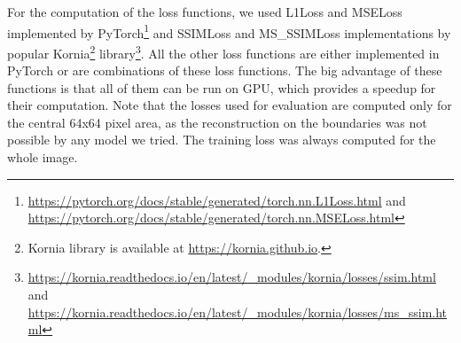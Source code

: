 For the computation of the loss functions, we used L1Loss and MSELoss implemented by PyTorch\footnote{\url{https://pytorch.org/docs/stable/generated/torch.nn.L1Loss.html} and \url{https://pytorch.org/docs/stable/generated/torch.nn.MSELoss.html}} and SSIMLoss and MS\_SSIMLoss implementations by popular Kornia\footnote{Kornia library is available at \url{https://kornia.github.io}.} library\footnote{\url{https://kornia.readthedocs.io/en/latest/_modules/kornia/losses/ssim.html} and \url{https://kornia.readthedocs.io/en/latest/_modules/kornia/losses/ms_ssim.html}}. All the other loss functions are either implemented in PyTorch or are combinations of these loss functions. The big advantage of these functions is that all of them can be run on GPU, which provides a speedup for their computation.
Note that the losses used for evaluation are computed only for the central 64x64 pixel area, as the reconstruction on the boundaries was not possible by any model we tried. The training loss was always computed for the whole image.
